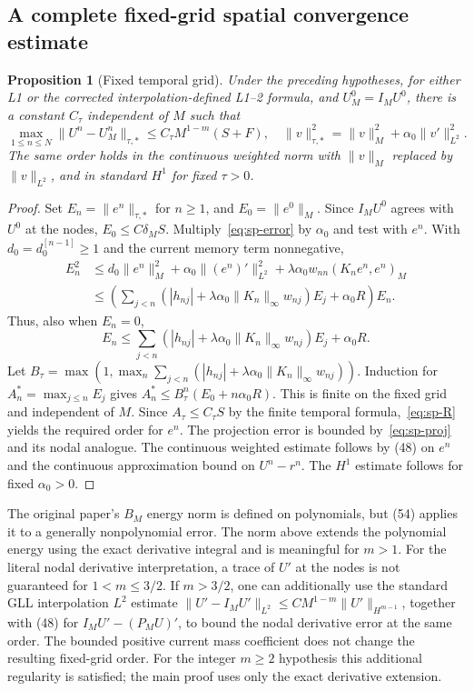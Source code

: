 \documentclass[11pt,a4paper]{amsart}
\theoremstyle{remark}
\theoremstyle{plain}
\newtheorem{proposition}{Proposition}[section]
\theoremstyle{remark}
\numberwithin{equation}{section}
\begin{document}
\subsection{A complete fixed-grid spatial convergence estimate}
\begin{proposition}[Fixed temporal grid]\label{prop:sp-fixed}
Under the preceding hypotheses, for either L1 or the corrected interpolation-defined L1--2 formula, and $U_M^0=I_M U^0$, there is a constant $C_\tau$ independent of $M$ such that
\[
 \max_{1\le n\le N}\|U^n-U_M^n\|_{\tau,*}\le C_\tau M^{1-m}(S+F),
 \quad \|v\|_{\tau,*}^2=\|v\|_M^2+\alpha_0\|v'\|_{L^2}^2.
\]
The same order holds in the continuous weighted norm with $\|v\|_M$ replaced by $\|v\|_{L^2}$, and in standard $H^1$ for fixed $\tau>0$.
\end{proposition}
\begin{proof}
Set $E_n=\|e^n\|_{\tau,*}$ for $n\ge1$, and $E_0=\|e^0\|_M$. Since $I_M U^0$ agrees with $U^0$ at the nodes, $E_0\le C\delta_M S$. Multiply~\eqref{eq:sp-error} by $\alpha_0$ and test with $e^n$. With $d_0=d_0^{[n-1]}\ge1$ and the current memory term nonnegative,
\begin{align*}
 E_n^2&\le d_0\|e^n\|_M^2+\alpha_0\|(e^n)'\|_{L^2}^2
 +\lambda\alpha_0w_{nn}(K_ne^n,e^n)_M\\
 &\le \left(\sum_{j<n}(|h_{nj}|+\lambda\alpha_0\|K_n\|_\infty w_{nj})E_j+\alpha_0 R\right)E_n.
\end{align*}
Thus, also when $E_n=0$,
\begin{equation}\label{eq:sp-rec}
 E_n\le\sum_{j<n}(|h_{nj}|+\lambda\alpha_0\|K_n\|_\infty w_{nj})E_j+\alpha_0 R.
\end{equation}
Let $B_\tau=\max(1,\max_n\sum_{j<n}(|h_{nj}|+\lambda\alpha_0\|K_n\|_\infty w_{nj}))$. Induction for $A_n^*=\max_{j\le n} E_j$ gives $A_n^*\le B_\tau^n(E_0+n\alpha_0R)$. This is finite on the fixed grid and independent of $M$. Since $A_\tau\le C_\tau S$ by the finite temporal formula,~\eqref{eq:sp-R} yields the required order for $e^n$. The projection error is bounded by~\eqref{eq:sp-proj} and its nodal analogue. The continuous weighted estimate follows by (48) on $e^n$ and the continuous approximation bound on $U^n-r^n$. The $H^1$ estimate follows for fixed $\alpha_0>0$.
\end{proof}
The original paper's $B_M$ energy norm is defined on polynomials, but (54) applies it to a generally nonpolynomial error. The norm above extends the polynomial energy using the exact derivative integral and is meaningful for $m>1$. For the literal nodal derivative interpretation, a trace of $U'$ at the nodes is not guaranteed for $1<m\le3/2$. If $m>3/2$, one can additionally use the standard GLL interpolation $L^2$ estimate $\|U'-I_M U'\|_{L^2}\le CM^{1-m}\|U'\|_{H^{m-1}}$, together with (48) for $I_M U'-(P_MU)'$, to bound the nodal derivative error at the same order. The bounded positive current mass coefficient does not change the resulting fixed-grid order. For the integer $m\ge2$ hypothesis this additional regularity is satisfied; the main proof uses only the exact derivative extension.
\end{document}
